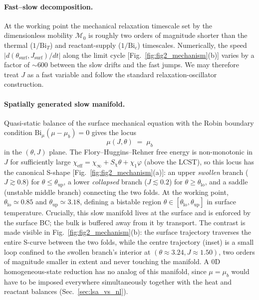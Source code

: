 \documentclass[aps,pre,reprint,superscriptaddress,longbibliography,floatfix]{revtex4-2}
\newcommand{\Ms}{\mathcal{M}}
\newcommand{\Bi}{\mathrm{Bi}}
\begin{document}
\paragraph{Fast--slow decomposition.}  At the working point the
mechanical relaxation timescale set by the dimensionless mobility
$\Ms_0$ is roughly two orders of magnitude shorter than the thermal
($1/\Bi_T$) and reactant-supply ($1/\Bi_c$) timescales.  Numerically,
the speed
$|d(\theta_\mathrm{surf}, J_\mathrm{surf})/dt|$ along the limit cycle
[Fig.~\ref{fig:fig2_mechanism}(b)]
varies by a factor of $\sim\!600$ between the slow drifts and the
fast jumps.  We may therefore treat $J$ as a fast variable and follow
the standard relaxation-oscillator construction.

\paragraph{Spatially generated slow manifold.}
Quasi-static balance of the surface mechanical equation with the
Robin boundary condition $\Bi_\mu(\mu - \mu_b) = 0$ gives the locus
\begin{equation}
  \mu(J,\theta) \;=\; \mu_b
  \label{eq:slow_manifold}
\end{equation}
in the $(\theta, J)$ plane.  The Flory--Huggins--Rehner free energy
is non-monotonic in $J$ for sufficiently large $\chi_\mathrm{eff}=
\chi_\infty + S_\chi\theta + \chi_1\varphi$ (above the LCST), so this
locus has the canonical S-shape
[Fig.~\ref{fig:fig2_mechanism}(a)]: an upper \emph{swollen} branch
($J \gtrsim 0.8$) for $\theta \le \theta_\mathrm{up}$, a lower
\emph{collapsed} branch ($J \lesssim 0.2$) for
$\theta \ge \theta_\mathrm{lo}$, and a saddle (unstable middle
branch) connecting the two folds.  At the working point,
$\theta_\mathrm{lo}\!\simeq\!0.85$ and
$\theta_\mathrm{up}\!\simeq\!3.18$, defining a bistable region
$\theta\in[\theta_\mathrm{lo},\theta_\mathrm{up}]$ in surface
temperature.  Crucially, this slow manifold lives at the surface and
is enforced by the surface BC; the bulk is buffered away from it by
transport. The contrast is made visible in
Fig.~\ref{fig:fig2_mechanism}(b): the surface trajectory traverses
the entire S-curve between the two folds, while the centre trajectory
(inset) is a small loop confined to the swollen branch's interior at
$(\theta\!\approx\!3.24, J\!\approx\!1.50)$, two orders of magnitude
smaller in extent and never touching the manifold. A 0D
homogeneous-state reduction has no analog of this manifold, since
$\mu = \mu_b$ would have to be imposed everywhere simultaneously
together with the heat and reactant balances
(Sec.~\ref{sec:lsa_vs_nl}).
\end{document}

